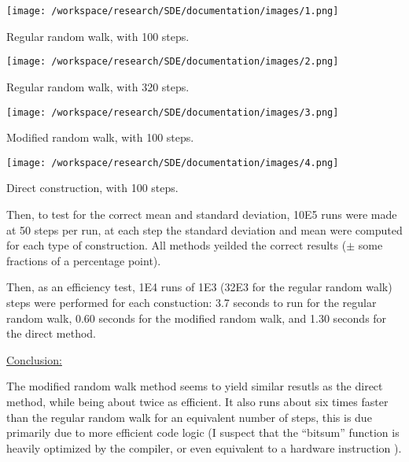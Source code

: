 \documentclass[12pt]{article}
\begin{document}
\texttt{[image: /workspace/research/SDE/documentation/images/1.png]}

Regular random walk, with 100 steps.

\texttt{[image: /workspace/research/SDE/documentation/images/2.png]}

Regular random walk, with 320 steps.

\texttt{[image: /workspace/research/SDE/documentation/images/3.png]}

Modified random walk, with 100 steps.

\texttt{[image: /workspace/research/SDE/documentation/images/4.png]}

Direct construction, with 100 steps.

\begin{flushleft}
Then, to test for the correct mean and standard deviation, 10E5 runs were made at 50 steps per run, at each step the standard deviation and mean were computed for each type of construction. All methods yeilded the correct results ($\pm$ some fractions of a percentage point).
\end{flushleft}

\begin{flushleft}
Then, as an efficiency test, 1E4 runs of 1E3 (32E3 for the regular random walk) steps were performed for each constuction: 3.7 seconds to run for the regular random walk, 0.60 seconds for the modified random walk, and 1.30 seconds for the direct method.
\end{flushleft}


\begin{flushleft}
\underline{Conclusion:}
\end{flushleft}


\begin{flushleft}
The modified random walk method seems to yield similar resutls as the direct method, while being about twice as efficient. It also runs about six times faster than the regular random walk for an equivalent number of steps, this is due primarily due to more efficient code logic (I suspect that the ``bitsum'' function is heavily optimized by the compiler, or even equivalent to a hardware instruction ).
\end{flushleft}
\end{document}
